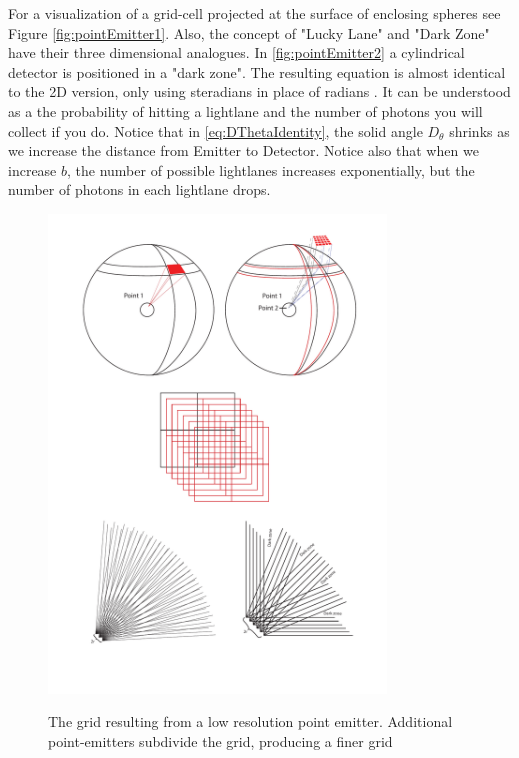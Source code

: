 \documentclass[notitlepage]{article}
\begin{document}
For a visualization of a grid-cell projected at the surface of enclosing spheres see Figure  \ref{fig:pointEmitter1}.   Also, the concept of "Lucky Lane" and "Dark Zone" have their three dimensional analogues. In \ref{fig:pointEmitter2} a cylindrical detector is positioned in a "dark zone". The resulting equation is almost identical to the 2D version, only using steradians in place of radians . It can be understood as a the probability of hitting a lightlane and the number of photons you will collect if you do. Notice that in \eqref{eq:DThetaIdentity},  the solid angle $D_\theta$ shrinks as we increase the distance from Emitter to Detector. Notice also that when we increase $b$, the number of possible lightlanes increases exponentially, but the number of photons in each lightlane drops. 


\begin{figure}
{\includegraphics[width=0.8\textwidth, trim={0cm 19cm 0cm 0cm},clip]{illustrations/PointEmitterToBodyEmitter.pdf}}
\caption{The grid resulting from a low resolution point emitter. Additional point-emitters subdivide the grid, producing a finer grid }

\end{figure}
\end{document}
